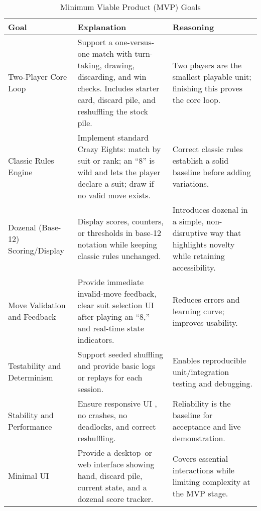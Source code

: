 \documentclass{article}
\begin{document}
    \begin{table}[h!]
        \caption{Minimum Viable Product (MVP) Goals}\label{TblMVPGoals}
        \begin{tabularx}{\textwidth}{|L|L|L|}
            \hline
            \textbf{Goal} & \textbf{Explanation} & \textbf{Reasoning} \\
            \hline
            Two-Player Core Loop &
            Support a one-versus-one match with turn-taking, drawing, discarding, and win checks. Includes starter card, discard pile, and reshuffling the stock pile. &
            Two players are the smallest playable unit; finishing this proves the core loop. \\
            \hline
            Classic Rules Engine &
            Implement standard Crazy Eights: match by suit or rank; an ``8'' is wild and lets the player declare a suit; draw if no valid move exists. &
            Correct classic rules establish a solid baseline before adding variations. \\
            \hline
            Dozenal (Base-12) Scoring/Display &
            Display scores, counters, or thresholds in base-12 notation while keeping classic rules unchanged. &
            Introduces dozenal in a simple, non-disruptive way that highlights novelty while retaining accessibility. \\
            \hline
            Move Validation and Feedback &
            Provide immediate invalid-move feedback, clear suit selection UI after playing an ``8,'' and real-time state indicators. &
            Reduces errors and learning curve; improves usability. \\
            \hline
            Testability and Determinism &
            Support seeded shuffling and provide basic logs or replays for each session. &
            Enables reproducible unit/integration testing and debugging. \\
            \hline
            Stability and Performance &
            Ensure responsive UI , no crashes, no deadlocks, and correct reshuffling. &
            Reliability is the baseline for acceptance and live demonstration. \\
            \hline
            Minimal UI &
            Provide a desktop~or web interface showing hand, discard pile, current state, and a dozenal score tracker. &
            Covers essential interactions while limiting complexity at the MVP stage. \\
            \hline
        \end{tabularx}
    \end{table}
\end{document}
